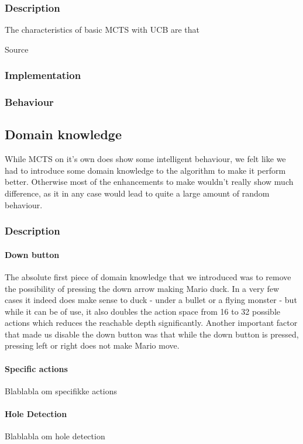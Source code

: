 \documentclass[10pt,a4paper]{article}
\begin{document}
\subsubsection{Description}
The characteristics of basic MCTS with UCB are that 

Source \cite{mctssurvey}

\subsubsection{Implementation}

\subsubsection{Behaviour}

\subsection{Domain knowledge}
While MCTS on it's own does show some intelligent behaviour, we felt like we had to introduce some domain knowledge to the algorithm to make it perform better. Otherwise most of the enhancements to make wouldn't really show much difference, as it in any case would lead to quite a large amount of random behaviour.

\subsubsection{Description}
\paragraph{Down button}
The absolute first piece of domain knowledge that we introduced was to remove the possibility of pressing the down arrow making Mario duck. In a very few cases it indeed does make sense to duck - under a bullet or a flying monster - but while it can be of use, it also doubles the action space from 16 to 32 possible actions which reduces the reachable depth significantly.
Another important factor that made us disable the down button was that while the down button is pressed, pressing left or right does not make Mario move.

\paragraph{Specific actions}
Blablabla om specifikke actions

\paragraph{Hole Detection}
Blablabla om hole detection
\end{document}
